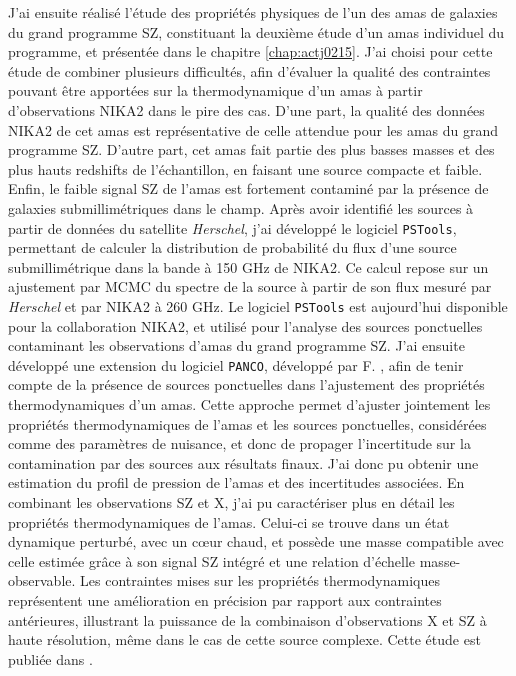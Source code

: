 J'ai ensuite réalisé l'étude des propriétés physiques de l'un des amas de galaxies du grand programme SZ, constituant la deuxième étude d'un amas individuel du programme, et présentée dans le chapitre \ref{chap:actj0215}.
J'ai choisi pour cette étude de combiner plusieurs difficultés, afin d'évaluer la qualité des contraintes pouvant être apportées sur la thermodynamique d'un amas à partir d'observations NIKA2 dans le pire des cas.
D'une part, la qualité des données NIKA2 de cet amas est représentative de celle attendue pour les amas du grand programme SZ.
D'autre part, cet amas fait partie des plus basses masses et des plus hauts redshifts de l'échantillon, en faisant une source compacte et faible.
Enfin, le faible signal SZ de l'amas est fortement contaminé par la présence de galaxies submillimétriques dans le champ.
Après avoir identifié les sources à partir de données du satellite \textit{Herschel}, j'ai développé le logiciel \texttt{PSTools}, permettant de calculer la distribution de probabilité du flux d'une source submillimétrique dans la bande à 150 GHz de NIKA2.
Ce calcul repose sur un ajustement par MCMC du spectre de la source à partir de son flux mesuré par \textit{Herschel} et par NIKA2 à 260 GHz.
Le logiciel \texttt{PSTools} est aujourd'hui disponible pour la collaboration NIKA2, et utilisé pour l'analyse des sources ponctuelles contaminant les observations d'amas du grand programme SZ.
J'ai ensuite développé une extension du logiciel \texttt{PANCO}, développé par F. , afin de tenir compte de la présence de sources ponctuelles dans l'ajustement des propriétés thermodynamiques d'un amas.
Cette approche permet d'ajuster jointement les propriétés thermodynamiques de l'amas et les sources ponctuelles, considérées comme des paramètres de nuisance, et donc de propager l'incertitude sur la contamination par des sources aux résultats finaux.
J'ai donc pu obtenir une estimation du profil de pression de l'amas et des incertitudes associées. %
En combinant les observations SZ et X, j'ai pu caractériser plus en détail les propriétés thermodynamiques de l'amas.
Celui-ci se trouve dans un état dynamique perturbé, avec un cœur chaud, et possède une masse compatible avec celle estimée grâce à son signal SZ intégré et une relation d'échelle masse-observable.
Les contraintes mises sur les propriétés thermodynamiques représentent une amélioration en précision par rapport aux contraintes antérieures, illustrant la puissance de la combinaison d'observations X et SZ à haute résolution, même dans le cas de cette source complexe.
Cette étude est publiée dans .

